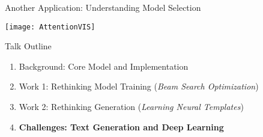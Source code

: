\begin{frame}{Another Application: Understanding Model Selection}
  \begin{center}
    \texttt{[image: AttentionVIS]}
  \end{center}
\end{frame}




\begin{frame}{Talk Outline}

  \begin{enumerate}
  \item Background: Core Model and Implementation
    \air
  \item Work 1: Rethinking Model Training (\textit{Beam Search Optimization})
    \air

  \item Work 2: Rethinking  Generation  (\textit{Learning Neural Templates})
    \air
  \item \textbf{Challenges: Text Generation and Deep Learning}
  \end{enumerate}
\end{frame}





